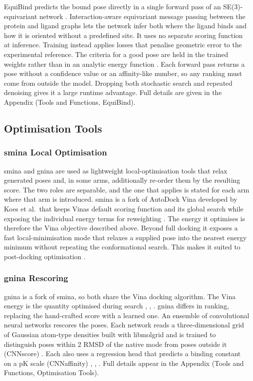 EquiBind predicts the bound pose directly in a single forward pass of an SE(3)-equivariant network \cite{ref010}. Interaction-aware equivariant message passing between the protein and ligand graphs lets the network infer both where the ligand binds and how it is oriented without a predefined site. It uses no separate scoring function at inference. Training instead applies losses that penalise geometric error to the experimental reference. The criteria for a good pose are held in the trained weights rather than in an analytic energy function \cite{ref010}. Each forward pass returns a pose without a confidence value or an affinity-like number, so any ranking must come from outside the model. Dropping both stochastic search and repeated denoising gives it a large runtime advantage. Full details are given in the Appendix (Tools and Functions, EquiBind).

\hypertarget{optimization-tools}{%
\subsection{Optimisation Tools}\label{optimization-tools}}

\hypertarget{smina}{%
\subsubsection{smina Local Optimisation}\label{smina}}

smina and gnina are used as lightweight local-optimisation tools that relax generated poses and, in some arms, additionally re-order them by the resulting score. The two roles are separable, and the one that applies is stated for each arm where that arm is introduced. smina is a fork of AutoDock Vina developed by Koes et al.\ that keeps Vina\textquotesingle s default scoring function and its global search while exposing the individual energy terms for reweighting \cite{ref055}. The energy it optimises is therefore the Vina objective described above. Beyond full docking it exposes a fast local-minimisation mode that relaxes a supplied pose into the nearest energy minimum without repeating the conformational search. This makes it suited to post-docking optimisation \cite{ref057}.

\hypertarget{gnina}{%
\subsubsection{gnina Rescoring}\label{gnina}}

gnina is a fork of smina, so both share the Vina docking algorithm. The Vina energy is the quantity optimised during search \cite{ref056}, \cite{ref067}, \cite{ref068}. gnina differs in ranking, replacing the hand-crafted score with a learned one. An ensemble of convolutional neural networks rescores the poses. Each network reads a three-dimensional grid of Gaussian atom-type densities built with libmolgrid \cite{ref076} and is trained to distinguish poses within 2\angstrom{} RMSD of the native mode from poses outside it (CNNscore) \cite{ref075}. Each also uses a regression head that predicts a binding constant on a pK scale (CNNaffinity) \cite{ref059}, \cite{ref056}, \cite{ref067}. Full details appear in the Appendix (Tools and Functions, Optimisation Tools).

